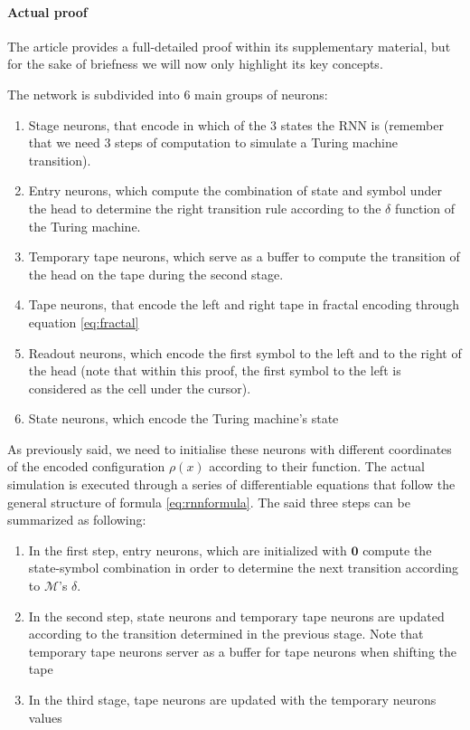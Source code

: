 \documentclass{article}
\begin{document}
\paragraph{Actual proof}
The article provides a full-detailed proof within its supplementary material, but for the sake of briefness we will now only highlight its key concepts.

The network is subdivided into 6 main groups of neurons:

\begin{enumerate}
    \item Stage neurons, that encode in which of the 3 states the RNN is (remember that we need 3 steps of computation to simulate a Turing machine transition).
    \item Entry neurons, which compute the combination of state and symbol under the head to determine the right transition rule according to the $\delta$ function of the Turing machine.
    \item Temporary tape neurons, which serve as a buffer to compute the transition of the head on the tape during the second stage.
    \item Tape neurons, that encode the left and right tape in fractal encoding through equation \ref{eq:fractal}
    \item Readout neurons, which encode the first symbol to the left and to the right of the head (note that within this proof, the first symbol to the left is considered as the cell under the cursor).
    \item State neurons, which encode the Turing machine's state
\end{enumerate}

As previously said, we need to initialise these neurons with different coordinates of the encoded configuration $\rho(x)$ according to their function. The actual simulation is executed through a series of differentiable equations that follow the general structure of formula \ref{eq:rnnformula}. The said three steps can be summarized as following:

\begin{enumerate}
    \item In the first step, entry neurons, which are initialized with $\mathbf{0}$ compute the state-symbol combination in order to determine the next transition according to $\mathcal{M}$'s $\delta$.
    \item In the second step, state neurons and temporary tape neurons are updated according to the transition determined in the previous stage. Note that temporary tape neurons server as a buffer for tape neurons when shifting the tape
    \item In the third stage, tape neurons are updated with the temporary neurons values
\end{enumerate}
\end{document}
